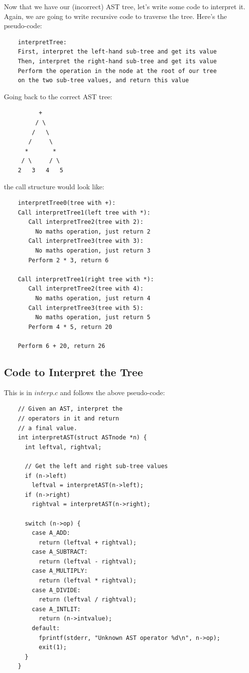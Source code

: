 \documentclass[journal, onecolumn, 12pt]{IEEEtran}
\begin{document}
Now that we have our (incorrect) AST tree, let's write some code to interpret it. Again, we are going to write recursive code to traverse the tree. Here's the pseudo-code:

\begin{lstlisting}
    interpretTree:
    First, interpret the left-hand sub-tree and get its value
    Then, interpret the right-hand sub-tree and get its value
    Perform the operation in the node at the root of our tree
    on the two sub-tree values, and return this value
\end{lstlisting}

Going back to the correct AST tree:

\begin{lstlisting}
          +
         / \
        /   \
       /     \
      *       *
     / \     / \
    2   3   4   5
\end{lstlisting}

the call structure would look like:

\begin{lstlisting}
    interpretTree0(tree with +):
    Call interpretTree1(left tree with *):
       Call interpretTree2(tree with 2):
         No maths operation, just return 2
       Call interpretTree3(tree with 3):
         No maths operation, just return 3
       Perform 2 * 3, return 6

    Call interpretTree1(right tree with *):
       Call interpretTree2(tree with 4):
         No maths operation, just return 4
       Call interpretTree3(tree with 5):
         No maths operation, just return 5
       Perform 4 * 5, return 20

    Perform 6 + 20, return 26
\end{lstlisting}

\subsection{Code to Interpret the Tree}

This is in $interp.c$ and follows the above pseudo-code:

\begin{lstlisting}
    // Given an AST, interpret the
    // operators in it and return
    // a final value.
    int interpretAST(struct ASTnode *n) {
      int leftval, rightval;

      // Get the left and right sub-tree values
      if (n->left)
        leftval = interpretAST(n->left);
      if (n->right)
        rightval = interpretAST(n->right);

      switch (n->op) {
        case A_ADD:
          return (leftval + rightval);
        case A_SUBTRACT:
          return (leftval - rightval);
        case A_MULTIPLY:
          return (leftval * rightval);
        case A_DIVIDE:
          return (leftval / rightval);
        case A_INTLIT:
          return (n->intvalue);
        default:
          fprintf(stderr, "Unknown AST operator %d\n", n->op);
          exit(1);
      }
    }
\end{lstlisting}
\end{document}
